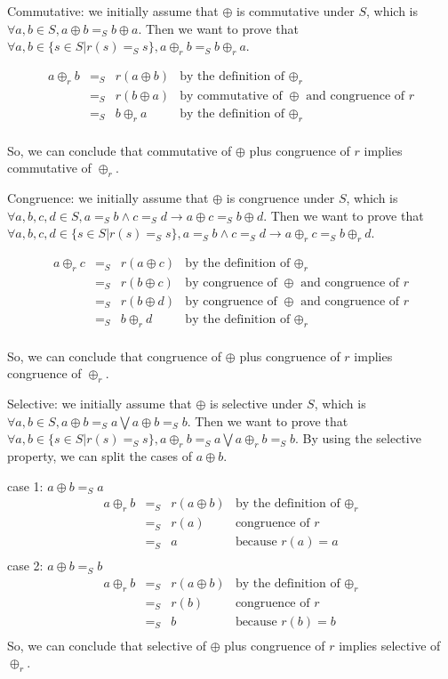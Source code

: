 \documentclass[a4paper,12pt,twoside,openright]{report}
\newcommand{\e}[2]{
\begin{equation}
  \label{#1} 
  #2
\end{equation}
}
\begin{document}
Commutative: we initially assume that $\oplus$ is commutative under $S$, which is $\forall a,b \in S, a \oplus b =_S b \oplus a$. Then we want to prove that $\forall a,b \in \{s \in S | r(s) =_S s\}, a \oplus_r b =_S b \oplus_r a$.
\e{r:proof:commutative}{
\begin{array}{rcll} 
a \oplus_r b & =_S & r(a \oplus b) &\mbox{by the definition of $\oplus_r$} \\
			 & =_S & r(b \oplus a) &\mbox{by commutative of $\oplus$ and congruence of $r$}\\
             & =_S & b \oplus_r a &\mbox{by the definition of $\oplus_r$} \\
\end{array}}
So, we can conclude that commutative of $\oplus$ plus congruence of $r$ implies commutative of $\oplus_r$.

Congruence: we initially assume that $\oplus$ is congruence under $S$, which is $\forall a,b,c,d \in S, a =_S b \wedge c =_S d \rightarrow a \oplus c =_S b \oplus d$. Then we want to prove that $\forall a,b,c,d \in \{s \in S | r(s) =_S s\}, a =_S b \wedge c =_S d \rightarrow a \oplus_r c =_S b \oplus_r d$.
\e{r:proof:congruence}{
\begin{array}{rcll} 
a \oplus_r c & =_S & r(a \oplus c) &\mbox{by the definition of $\oplus_r$} \\
			 & =_S & r(b \oplus c) &\mbox{by congruence of $\oplus$ and congruence of $r$}\\
			 & =_S & r(b \oplus d) &\mbox{by congruence of $\oplus$ and congruence of $r$}\\
             & =_S & b \oplus_r d &\mbox{by the definition of $\oplus_r$} \\
\end{array}}
So, we can conclude that congruence of $\oplus$ plus congruence of $r$ implies congruence of $\oplus_r$.

Selective: we initially assume that $\oplus$ is selective under $S$, which is $\forall a,b \in S, a \oplus b =_S a \bigvee a \oplus b =_S b$. Then we want to prove that $\forall a,b \in \{s \in S | r(s) =_S s\}, a \oplus_r b =_S a \bigvee a \oplus_r b =_S b$. By using the selective property, we can split the cases of $a\oplus b$.

case 1: $a \oplus b =_S a$
\[
\begin{array}{rcll} 
a \oplus_r b & =_S & r(a \oplus b) &\mbox{by the definition of $\oplus_r$} \\
			 & =_S & r(a) &\mbox{congruence of $r$}\\
			 & =_S & a &\mbox{because $r(a) = a$}\\
\end{array}
\]
case 2: $a \oplus b =_S b$
\[
\begin{array}{rcll} 
a \oplus_r b & =_S & r(a \oplus b) &\mbox{by the definition of $\oplus_r$} \\
			 & =_S & r(b) &\mbox{congruence of $r$}\\
			 & =_S & b &\mbox{because $r(b) = b$}\\
\end{array}
\]
So, we can conclude that selective of $\oplus$ plus congruence of $r$ implies selective of $\oplus_r$.
\end{document}
